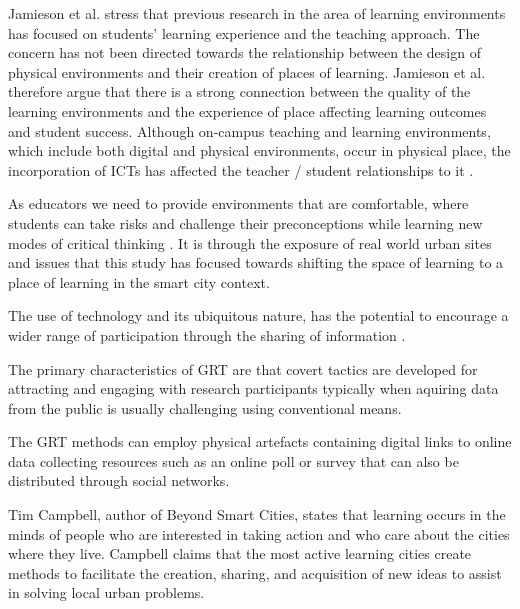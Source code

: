Jamieson et al. \cite{jamieson_place_2000} stress that previous research in the area of learning environments has focused on students’ learning experience and the teaching approach. The concern has not been directed towards the relationship between the design of physical environments and their creation of places of learning. Jamieson et al. \cite{jamieson_place_2000} therefore argue that there is a strong connection between the quality of the learning environments and the experience of place affecting learning outcomes and student success. Although on-campus teaching and learning environments, which include both digital and physical environments, occur in physical place, the incorporation of ICTs has affected the teacher / student relationships to it \cite{jamieson_place_2000}. 

As educators we need to provide environments that are comfortable, where students can take risks and challenge their preconceptions while learning new modes of critical thinking \cite{kolb_learning_2000}. It is through the exposure of real world urban sites and issues that this study has focused towards shifting the space of learning to a place of learning in the smart city context.\cite{amayocaldwell_urban_2013}

The use of technology and its ubiquitous nature, has the potential to encourage a wider range of participation through the sharing of information \cite{fredericks_augmenting_2013} \cite{houghton_appropriating_2013}.

The primary characteristics of GRT are that covert tactics are developed for attracting and engaging with research participants typically when aquiring data from the public is usually challenging using conventional means.\cite{amayocaldwell_urban_2013}

The GRT methods can employ physical artefacts containing digital links to online data collecting resources such as an online poll or survey that can also be distributed through social networks.\cite{amayocaldwell_urban_2013}

Tim Campbell, author of Beyond Smart Cities\cite{campbell_smart_2013}, states that learning occurs in the minds of people who are interested in taking action and who care about the cities where they live. Campbell claims that the most active learning cities create methods to facilitate the creation, sharing, and acquisition of new ideas to assist in solving local urban problems. \cite{amayocaldwell_urban_2013}

